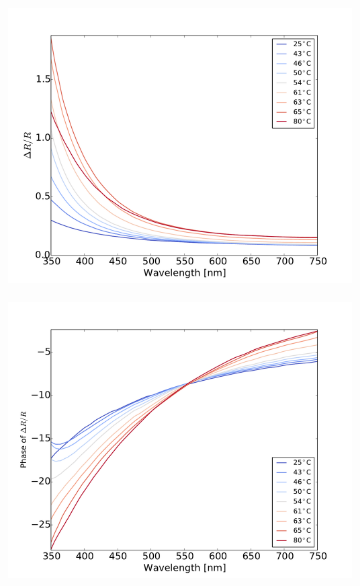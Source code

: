 \begin{figure}
    \centering
    \begin{subfigure}[b]{0.3\textwidth}
        \centering
        \includegraphics[width=\textwidth]{Results/Sim3/dR_visible.pdf}
        \caption{}
    \end{subfigure}
    \begin{subfigure}[b]{0.3\textwidth}
        \centering
        \includegraphics[width=\textwidth]{Results/Sim3/dRphase_visible.pdf}
        \caption{}
    \end{subfigure}

\end{figure}
